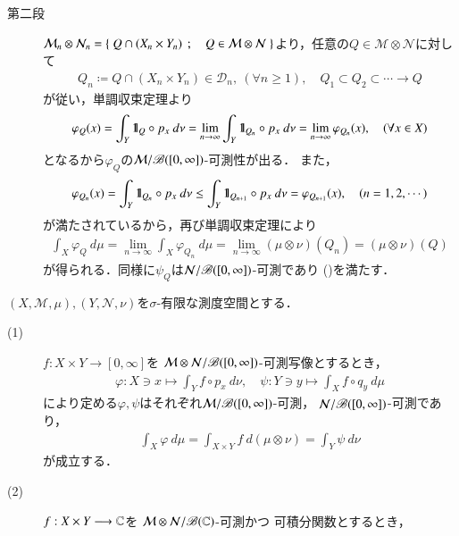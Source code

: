 \begin{prf}
\begin{description}
			\item[第二段]
				$\mathcal{M}_n \otimes \mathcal{N}_n = \left\{\ Q \cap (X_n \times Y_n)\ \, ; \quad Q \in \mathcal{M} \otimes \mathcal{N}\ \right\}$より，任意の$Q \in \mathcal{M} \otimes \mathcal{N}$に対して
				\begin{align}
					Q_n \coloneqq Q \cap (X_n \times Y_n) \in \mathcal{D}_n,
					\ (\forall n \geq 1),
					\quad Q_1 \subset Q_2 \subset \cdots \longrightarrow Q
				\end{align}
				が従い，単調収束定理より
				\begin{align}
					\varphi_Q(x) = \int_Y \mbox{1}\hspace{-0.25em}\mbox{l}_Q \circ p_x\ d\nu
					= \lim_{n \to \infty} \int_Y \mbox{1}\hspace{-0.25em}\mbox{l}_{Q_n} \circ p_x\ d\nu
					= \lim_{n \to \infty} \varphi_{Q_n}(x),
					\quad (\forall x \in X)
				\end{align}
				となるから$\varphi_Q$の$\mathcal{M}/\mathscr{B}([0,\infty])$-可測性が出る．
				また，
				\begin{align}
					\varphi_{Q_n}(x) = \int_Y \defunc_{Q_n} \circ p_x\ d\nu
					\leq \int_Y \defunc_{Q_{n+1}} \circ p_x\ d\nu
					= \varphi_{Q_{n+1}}(x),
					\quad (n=1,2,\cdots)
				\end{align}
				が満たされているから，再び単調収束定理により
				\begin{align}
					\int_X \varphi_Q\ d\mu
					= \lim_{n \to \infty} \int_X \varphi_{Q_n}\ d\mu
					= \lim_{n \to \infty} (\mu \otimes \nu)(Q_n)
					= (\mu \otimes \nu)(Q)
				\end{align}
				が得られる．同様に$\psi_Q$は$\mathcal{N}/\mathscr{B}([0,\infty])$-可測であり
				()を満たす．
				\QED
		\end{description}
	\end{prf}
	
	\begin{screen}
		\begin{thm}[Fubini]
			$(X,\mathcal{M},\mu),(Y,\mathcal{N},\nu)$を$\sigma$-有限な測度空間とする．
			\begin{description}
				\item[(1)]
					$f:X \times Y \longrightarrow [0,\infty]$を
					$\mathcal{M} \otimes \mathcal{N}/\mathscr{B}([0,\infty])$-可測写像とするとき，
					\begin{align}
						\varphi: X \ni x \longmapsto \int_Y f \circ p_x\ d\nu,
						\quad \psi: Y \ni y \longmapsto \int_X f \circ q_y\ d\mu
					\end{align}
					により定める$\varphi,\psi$はそれぞれ$\mathcal{M}/\mathscr{B}([0,\infty])$-可測，
					$\mathcal{N}/\mathscr{B}([0,\infty])$-可測であり，
					\begin{align}
						\int_X \varphi\ d\mu
						= \int_{X \times Y} f\ d(\mu \otimes \nu)
						= \int_Y \psi\ d\nu
					\end{align}
					が成立する．
					
				\item[(2)]
					$f:X \times Y \longrightarrow \mathbb{C}$を
					$\mathcal{M} \otimes \mathcal{N}/\mathscr{B}(\mathbb{C})$-可測かつ
					可積分関数とするとき，
			\end{description}
		\end{thm}
	\end{screen}
	
